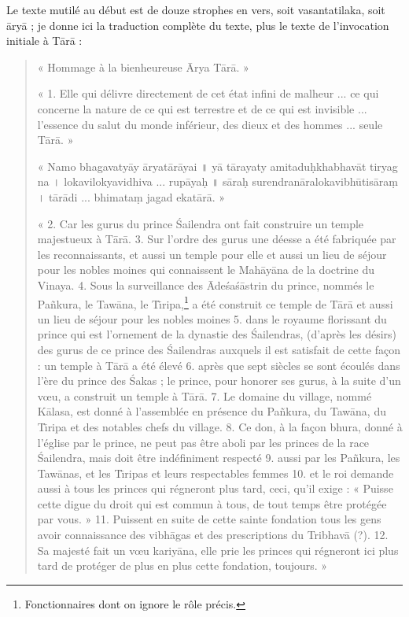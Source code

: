 \documentclass[a4paper, 11pt, oneside, french]{article}
\begin{document}
Le texte mutilé au début est de douze strophes en vers, soit vasantatilaka, soit \={a}ry\={a} ; je donne ici la traduction complète du texte, plus le texte de l'invocation initiale à T\={a}r\={a} :
\begin{quotation}
« Hommage à la bienheureuse \={A}rya T\={a}r\={a}. »

\bigskip

« 1. Elle qui délivre directement de cet état infini de malheur ... ce qui concerne la nature de ce qui est terrestre et de ce qui est invisible ... l'essence du salut du monde inférieur, des dieux et des hommes ... seule T\={a}r\={a}. »

« Namo bhagavaty\={a}y \={a}ryat\={a}r\={a}yai \texthindi{॥} y\={a} t\={a}rayaty amitadu\d{h}khabhav\={a}t tiryag na \texthindi{।} lokavilokyavidhiva ... rup\={a}ya\d{h} \texthindi{॥} s\={a}ra\d{h} surendran\={a}ralokavibh\={u}tis\={a}ra\d{m} \texthindi{।} t\={a}r\={a}di ... bhimata\d{m} jagad ekat\={a}r\={a}. »

\bigskip

« 2. Car les gurus du prince \'{S}ailendra ont fait construire un temple majestueux à T\={a}r\={a}. 3. Sur l'ordre des gurus une déesse a été fabriquée par les reconnaissants, et aussi un temple pour elle et aussi un lieu de séjour pour les nobles moines qui connaissent le Mah\={a}y\={a}na de la doctrine du Vinaya. 4. Sous la surveillance des \={A}de\'{s}a\'{s}\={a}strin du prince, nommés le Pa\~{n}kura, le Taw\={a}na, le T\={\i}ripa,\footnote{Fonctionnaires dont on ignore le rôle précis.} a été construit ce temple de T\={a}r\={a} et aussi un lieu de séjour pour les nobles moines 5. dans le royaume florissant du prince qui est l'ornement de la dynastie des \'{S}ailendras, (d'après les désirs) des gurus de ce prince des \'{S}ailendras auxquels il est satisfait de cette façon : un temple à T\={a}r\={a} a été élevé 6. après que sept siècles se sont écoulés dans l'ère du prince des \'{S}akas ; le prince, pour honorer ses gurus, à la suite d'un vœu, a construit un temple à T\={a}r\={a}. 7. Le domaine du village, nommé K\={a}lasa, est donné à l'assemblée en présence du Pa\~{n}kura, du Taw\={a}na, du T\={\i}ripa et des notables chefs du village. 8. Ce don, à la façon bhura, donné à l'église par le prince, ne peut pas être aboli par les princes de la race \'{S}ailendra, mais doit être indéfiniment respecté 9. aussi par les Pa\~{n}kura, les Taw\={a}nas, et les T\={\i}ripas et leurs respectables femmes 10. et le roi demande aussi à tous les princes qui régneront plus tard, ceci, qu'il exige : « Puisse cette digue du droit qui est commun à tous, de tout temps être protégée par vous. » 11. Puissent en suite de cette sainte fondation tous les gens avoir connaissance des vibh\={a}gas et des prescriptions du Tribhav\={a} (?). 12. Sa majesté fait un vœu kariy\={a}na, elle prie les princes qui régneront ici plus tard de protéger de plus en plus cette fondation, toujours. »
\end{quotation}
\end{document}
